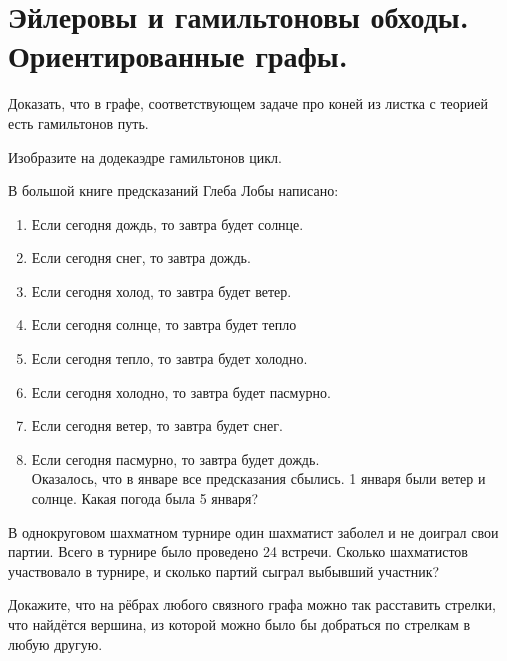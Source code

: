 
\section{Эйлеровы и гамильтоновы обходы. Ориентированные графы.}

\begin{thm}
    Доказать, что в графе, соответствующем задаче про коней из листка с теорией есть гамильтонов путь.
\end{thm}

\begin{ex}
    Изобразите на додекаэдре гамильтонов цикл.
\end{ex}

\begin{thm}
    В большой книге предсказаний Глеба Лобы написано:
    \begin{enumerate}[itemsep=0.05em]
        \item Если сегодня дождь, то завтра будет солнце.
        \item Если сегодня снег, то завтра дождь.
        \item Если сегодня холод, то завтра будет ветер.
        \item Если сегодня солнце, то завтра будет тепло
        \item Если сегодня тепло, то завтра будет холодно.
        \item Если сегодня холодно, то завтра будет пасмурно.
        \item Если сегодня ветер, то завтра будет снег.
        \item Если сегодня пасмурно, то завтра будет дождь.
    \\ Оказалось, что в январе все предсказания сбылись. 1 января были ветер и солнце. Какая погода была 5 января?
    \end{enumerate}
\end{thm}

\begin{thm}
    В однокруговом шахматном турнире один шахматист заболел и не доиграл свои партии. Всего в турнире было проведено 24 встречи. Сколько шахматистов участвовало в турнире, и сколько партий сыграл выбывший участник?
\end{thm}

\begin{thm}
    Докажите, что на рёбрах любого связного графа можно так расставить стрелки, что найдётся вершина, из которой можно было бы добраться по стрелкам в любую другую.
\end{thm}

